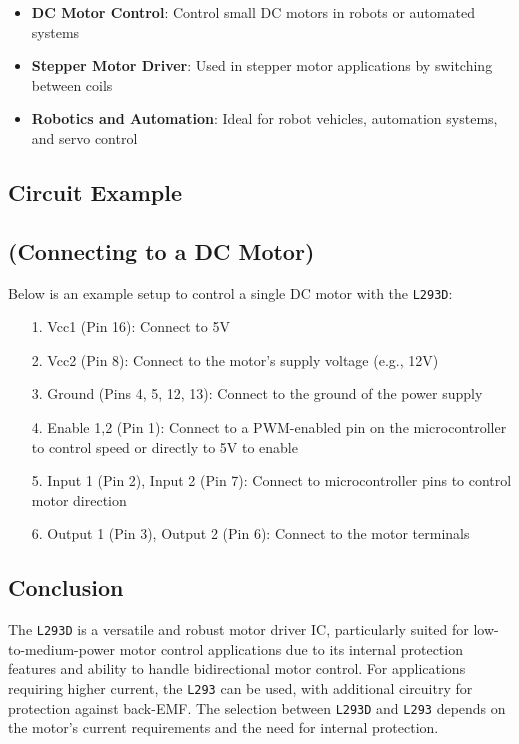 \documentclass[a4paper,12pt]{article}
\begin{document}
\begin{itemize}
    \item \textbf{DC Motor Control}: Control small DC motors in robots or automated systems
    \item \textbf{Stepper Motor Driver}: Used in stepper motor applications by switching between coils
    \item \textbf{Robotics and Automation}: Ideal for robot vehicles, automation systems, and servo control
\end{itemize}

\subsection{Circuit Example}
\subsection*{(Connecting to a DC Motor)}
Below is an example setup to control a single DC motor with the \texttt{L293D}:

\begin{itemize}
    \item[1.] Vcc1 (Pin 16): Connect to 5V
    \item[2.] Vcc2 (Pin 8): Connect to the motor’s supply voltage (e.g., 12V)
    \item[3.] Ground (Pins 4, 5, 12, 13): Connect to the ground of the power supply
    \item[4.] Enable 1,2 (Pin 1): Connect to a PWM-enabled pin on the microcontroller to control speed or directly to 5V to enable
    \item[5.] Input 1 (Pin 2), Input 2 (Pin 7): Connect to microcontroller pins to control motor direction
    \item[6.] Output 1 (Pin 3), Output 2 (Pin 6): Connect to the motor terminals
\end{itemize}

\subsection{Conclusion}
The \texttt{L293D} is a versatile and robust motor driver IC, particularly suited for low-to-medium-power motor control applications due to its internal protection features and ability to handle bidirectional motor control. For applications requiring higher current, the \texttt{L293} can be used, with additional circuitry for protection against back-EMF. The selection between \texttt{L293D} and \texttt{L293} depends on the motor's current requirements and the need for internal protection.
\end{document}
